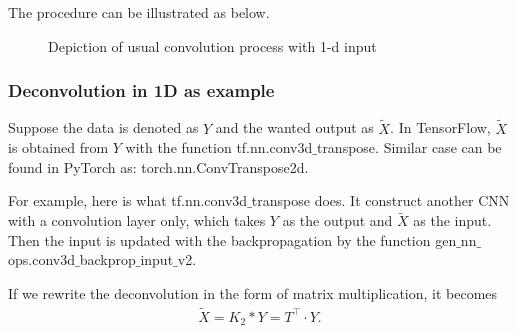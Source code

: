 The procedure can be illustrated as below.
\begin{figure}[htbp]
\caption{Depiction of usual convolution process with 1-d input}
\end{figure}


\subsubsection{Deconvolution in 1D as example}
Suppose the data is denoted as $Y$ and the wanted output as $\tilde{X}$. 
In TensorFlow, $\tilde{X}$ is obtained from $Y$ with the function tf.nn.conv3d$\_$transpose. 
Similar case can be found in PyTorch as: torch.nn.ConvTranspose2d.

For example, here is what tf.nn.conv3d$\_$transpose does.
It construct another CNN with a convolution layer only, which takes $Y$ as 
the output and $\tilde{X}$ as the input. Then  the input is updated with the 
backpropagation by the function gen$\_$nn$\_$ops.conv3d$\_$backprop$\_$input$\_$v2. 

If we rewrite the deconvolution in the form of matrix multiplication, it becomes
\begin{align}
   \tilde{X} = K_2 \ast Y = T^\top \cdot Y.
\end{align}


